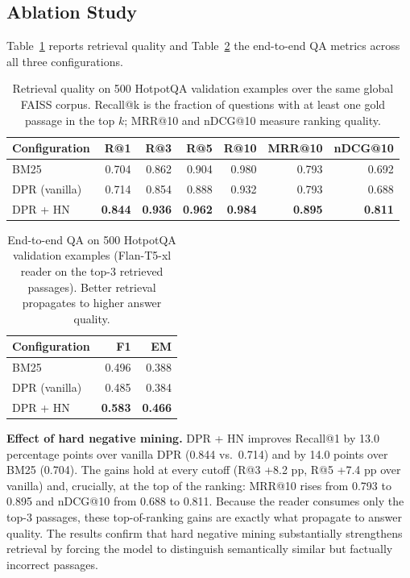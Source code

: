 \documentclass{llncs}
\begin{document}
\subsection{Ablation Study}

Table~\ref{tab:ablation} reports retrieval quality and Table~\ref{tab:qa} the
end-to-end QA metrics across all three configurations.

\begin{table}[t]
\centering
\caption{Retrieval quality on 500 HotpotQA validation examples over the same
global FAISS corpus. Recall@k is the fraction of questions
with at least one gold passage in the top $k$; MRR@10 and nDCG@10 measure
ranking quality.}
\label{tab:ablation}
\begin{tabular}{lrrrrrr}
\toprule
\textbf{Configuration} & \textbf{R@1} & \textbf{R@3} & \textbf{R@5}
    & \textbf{R@10} & \textbf{MRR@10} & \textbf{nDCG@10} \\
\midrule
BM25                   & 0.704 & 0.862 & 0.904 & 0.980 & 0.793 & 0.692 \\
DPR (vanilla)          & 0.714 & 0.854 & 0.888 & 0.932 & 0.793 & 0.688 \\
DPR + HN               & \textbf{0.844} & \textbf{0.936} & \textbf{0.962}
    & \textbf{0.984} & \textbf{0.895} & \textbf{0.811} \\
\bottomrule
\end{tabular}
\end{table}

\begin{table}[t]
\centering
\caption{End-to-end QA on 500 HotpotQA validation examples (Flan-T5-xl reader
on the top-3 retrieved passages). Better retrieval propagates to higher
answer quality.}
\label{tab:qa}
\begin{tabular}{lrr}
\toprule
\textbf{Configuration} & \textbf{F1} & \textbf{EM} \\
\midrule
BM25                   & 0.496 & 0.388 \\
DPR (vanilla)          & 0.485 & 0.384 \\
DPR + HN               & \textbf{0.583} & \textbf{0.466} \\
\bottomrule
\end{tabular}
\end{table}

\noindent\textbf{Effect of hard negative mining.}
DPR + HN improves Recall@1 by 13.0 percentage points over vanilla DPR
(0.844 vs.\ 0.714) and by 14.0 points over BM25 (0.704). The gains hold at
every cutoff (R@3 +8.2 pp, R@5 +7.4 pp over vanilla) and, crucially, at the top of
the ranking: MRR@10 rises from 0.793 to 0.895 and nDCG@10 from 0.688 to
0.811. Because the reader consumes only the top-3 passages, these
top-of-ranking gains are exactly what propagate to answer quality. The results
confirm that hard negative mining substantially strengthens retrieval by
forcing the model to distinguish semantically similar but factually incorrect
passages.
\end{document}
